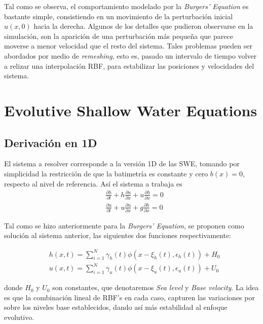 \documentclass[spanish]{article}
\begin{document}
	Tal como se observa, el comportamiento modelado por la \textit{Burgers' Equation} es bastante simple, consistiendo en un
    movimiento de la perturbación inicial $u(x,0)$ hacia la derecha. Algunos de los detalles que pudieron 
    observarse en la simulación, son la aparición de una perturbación más pequeña que parece moverse a menor velocidad que el
    resto del sistema. Tales problemas pueden ser abordados por medio de \textit{remeshing}, esto es, pasado un intervalo de tiempo volver a relizar una interpolación RBF, para estabilizar las posiciones y velocidades del sistema.
    
    \section{Evolutive Shallow Water Equations}

    \subsection{Derivación en 1D}

    El sistema a resolver corresponde a la versión 1D de las SWE, tomando por simplicidad la restricción de que la batimetría es constante y cero $b(x)=0$, respecto al nivel de referencia. Así el sistema a trabaja es
\begin{align}
 & \frac{\partial h}{\partial t} + h \frac{\partial u}{\partial x} + u \frac{\partial h}{\partial x} = 0 \label{eq:continuity}\\
 & \frac{\partial u}{\partial t} + u \frac{\partial u}{\partial x} + g \frac{\partial h}{\partial x} = 0 \label{eq:momentum}
\end{align}

	Tal como se hizo anteriormente para la \textit{Burgers' Equation}, se proponen como solución al sistema anterior, las siguientes dos funciones respectivamente:

\begin{align}
 	& h(x,t) = \sum_{i=1}^{N} \gamma_h(t)\phi(x-\xi_h(t),\epsilon_h(t)) + H_0 \label{eq:happ}\\
 	& u(x,t) = \sum_{i=1}^{N} \gamma_u(t)\phi(x-\xi_u(t),\epsilon_u(t)) + U_0 \label{eq:uapp}
 \end{align}

 	donde $H_0$ y $U_0$ son constantes, que denotaremos \textit{Sea level} y \textit{Base velocity}. La idea es que la
 	combinación lineal de RBF's en cada caso, capturen las variaciones por sobre los niveles base establecidos, dando así 
 	más estabilidad al enfoque evolutivo.
\end{document}
